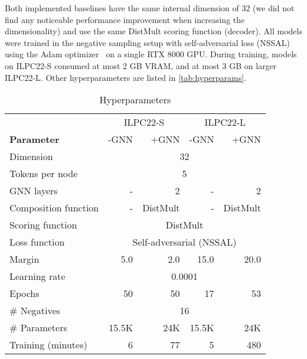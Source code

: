 \documentclass[sigconf,screen]{acmart}
\begin{document}
Both implemented baselines have the same internal dimension of 32 (we did not find any noticeable performance improvement when increasing the dimensionality) and use the same DistMult scoring  function (decoder).
All models were trained in the negative sampling setup with self-adversarial loss (NSSAL) \cite{DBLP:conf/iclr/SunDNT19} using the Adam optimizer~\cite{DBLP:journals/corr/KingmaB14} on a single RTX 8000 GPU. 
During training, models on ILPC22-S consumed at most 2 GB VRAM, and at most 3 GB on larger ILPC22-L.
Other hyperparameters are listed in \autoref{tab:hyperparams}.

\begin{table}[]
    \centering
    \begin{tabular}{lrrrr}
        \toprule
         & \multicolumn{2}{c}{ILPC22-S} & \multicolumn{2}{c}{ILPC22-L} \\
        \textbf{Parameter} & -GNN & +GNN               & -GNN & +GNN \\
        \midrule
        Dimension       & \multicolumn{4}{c}{32}\\
        Tokens per node & \multicolumn{4}{c}{5}\\
        GNN layers      & -         & 2	    & -     & 2\\
        Composition function & -    & DistMult & - & DistMult\\
        Scoring function & \multicolumn{4}{c}{DistMult}\\
        Loss function   & \multicolumn{4}{c}{Self-adversarial (NSSAL)}\\
        Margin          & 5.0       & 2.0	& 15.0  & 20.0\\
        Learning rate   & \multicolumn{4}{c}{0.0001}\\
        Epochs          & 50     & 50	& 17 & 53\\
        \# Negatives    & \multicolumn{4}{c}{16}\\
        \# Parameters   & 15.5K & 24K & 15.5K & 24K\\
        Training (minutes)   & 6     & 77	& 5 & 480\\
        \bottomrule 
    \end{tabular}
    \caption{Hyperparameters}
    \label{tab:hyperparams}
\end{table}
\end{document}
